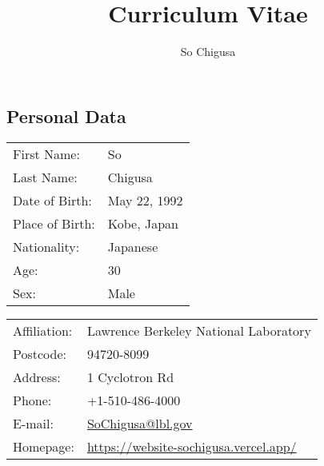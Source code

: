 \documentclass[12pt]{article}
\title{\vspace{-2cm}\textbf{Curriculum Vitae}}
\author{So Chigusa}
\begin{document}
\large
\maketitle

\newcommand{\lsim}{\stackrel{<}{_\sim}}
\newcommand{\gsim}{\stackrel{>}{_\sim}}

\newcommand{\rem}[1]{{$\spadesuit$\bf #1$\spadesuit$}}


\renewcommand{\thefootnote}{\arabic{footnote})}
\setcounter{footnote}{0}

\vspace{-5mm}
\subsection*{Personal Data}

\vspace{-3mm}

\begin{table}[h]
 \begin{tabular}{ll}
  First Name: & So %
      \\
  Last Name: & Chigusa %
      \\
  Date of Birth: & May 22, 1992 \\
  Place of Birth: & Kobe, Japan \\
  Nationality: & Japanese \\
  Age: & 30 \\
  Sex: & Male \\
 \end{tabular}
\end{table}

\vspace{-5mm}
\begin{table}[h]
 \begin{tabular}{ll}
  Affiliation: & Lawrence Berkeley National Laboratory \\
  Postcode: & 94720-8099 \\
  Address: & 1 Cyclotron Rd \\
  Phone: & +1-510-486-4000 \\
  E-mail: &
      \href{mailto:SoChigusa@lbl.gov}{SoChigusa@lbl.gov}
      \\
  Homepage: & \url{https://website-sochigusa.vercel.app/} \\
 \end{tabular}
\end{table}
\vspace{-5mm}
\end{document}
